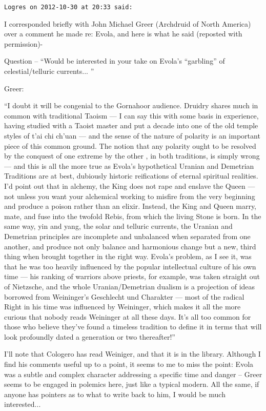 \begin{footnotesize}
\begin{sffamily}
\texttt{Logres on 2012-10-30 at 20:33 said:}

I corresponded briefly with John Michael Greer (Archdruid of North America) over a comment he made re: Evola, and here is what he said (reposted with permission)-

Question -- ``Would be interested in your take on Evola's ``garbling'' of celestial/telluric currents... ''

Greer:

``I doubt it will be congenial to the Gornahoor audience. Druidry shares much in common with traditional Taoism --- I can say this with some basis in experience, having studied with a Taoist master and put a decade into one of the old temple styles of t'ai chi ch'uan --- and the sense of the nature of polarity is an important piece of this common ground. The notion that any polarity ought to be resolved by the conquest of one extreme by the other , in both traditions, is simply wrong --- and this is all the more true as Evola's hypothetical Uranian and Demetrian Traditions are at best, dubiously historic reifications of eternal spiritual realities. I'd point out that in alchemy, the King does not rape and enslave the Queen --- not unless you want your alchemical working to misfire from the very beginning and produce a poison rather than an elixir. Instead, the King and Queen marry, mate, and fuse into the twofold Rebis, from which the living Stone is born. In the same way, yin and yang, the solar and telluric currents, the Uranian and Demetrian principles are incomplete and unbalanced when separated from one another, and produce not only balance and harmonious change but a new, third thing when brought together in the right way. Evola's problem, as I see it, was that he was too heavily influenced by the popular intellectual culture of his own time --- his ranking of warriors above priests, for example, was taken straight out of Nietzsche, and the whole Uranian/Demetrian dualism is a projection of ideas borrowed from Weininger's Geschlecht und Charakter --- most of the radical Right in his time was influenced by Weininger, which makes it all the more curious that nobody reads Weininger at all these days. It's all too common for those who believe they've found a timeless tradition to define it in terms that will look profoundly dated a generation or two thereafter!''

I'll note that Cologero has read Weiniger, and that it is in the library. Although I find his comments useful up to a point, it seems to me to miss the point: Evola was a subtle and complex character addressing a specific time and danger -- Greer seems to be engaged in polemics here, just like a typical modern. All the same, if anyone has pointers as to what to write back to him, I would be much interested... 


\end{sffamily}
\end{footnotesize}
